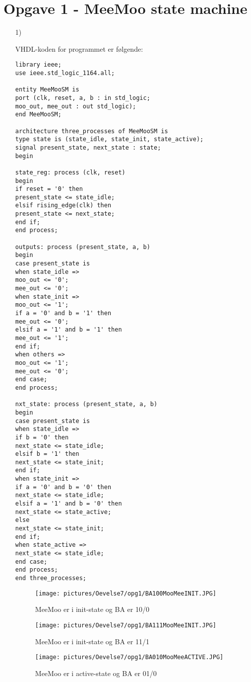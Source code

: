 \section{Opgave 1 - MeeMoo state machine}
\begin{enumerate}
	\item[1)]
	
	VHDL-koden for programmet er følgende:
	
\begin{lstlisting}[caption={Kode for MeeMoo state machine},label={lst:MeeMooSM}]
library ieee;
use ieee.std_logic_1164.all;

entity MeeMooSM is
port (clk, reset, a, b : in std_logic;
moo_out, mee_out : out std_logic);
end MeeMooSM;

architecture three_processes of MeeMooSM is
type state is (state_idle, state_init, state_active);
signal present_state, next_state : state;
begin

state_reg: process (clk, reset)
begin
if reset = '0' then
present_state <= state_idle;
elsif rising_edge(clk) then
present_state <= next_state;
end if;
end process;

outputs: process (present_state, a, b)
begin	
case present_state is
when state_idle => 
moo_out <= '0';
mee_out <= '0';
when state_init => 
moo_out <= '1';
if a = '0' and b = '1' then
mee_out <= '0';
elsif a = '1' and b = '1' then
mee_out <= '1';
end if;
when others => 
moo_out <= '1';
mee_out <= '0';
end case;
end process;

nxt_state: process (present_state, a, b)
begin
case present_state is
when state_idle =>
if b = '0' then
next_state <= state_idle;
elsif b = '1' then
next_state <= state_init;
end if;
when state_init =>
if a = '0' and b = '0' then
next_state <= state_idle;
elsif a = '1' and b = '0' then
next_state <= state_active;
else 
next_state <= state_init;
end if;
when state_active =>
next_state <= state_idle;
end case;
end process;
end three_processes;

\end{lstlisting}

\begin{figure}[h]
	\centering
	\texttt{[image: pictures/Oevelse7/opg1/BA100MooMeeINIT.JPG]}
	\caption{MeeMoo er i init-state og BA er 10/0}
	\label{fig:BA100MooMeeINIT}
\end{figure}
		
\begin{figure}[h]
	\centering
	\texttt{[image: pictures/Oevelse7/opg1/BA111MooMeeINIT.JPG]}
	\caption{MeeMoo er i init-state og BA er 11/1}
	\label{fig:BA111MooMeeINIT}
\end{figure}


\begin{figure}[h]
	\centering
	\texttt{[image: pictures/Oevelse7/opg1/BA010MooMeeACTIVE.JPG]}
	\caption{MeeMoo er i active-state og BA er 01/0}
	\label{fig:BA010MooMeeACTIVE}
\end{figure}

\end{enumerate}
	\newpage
